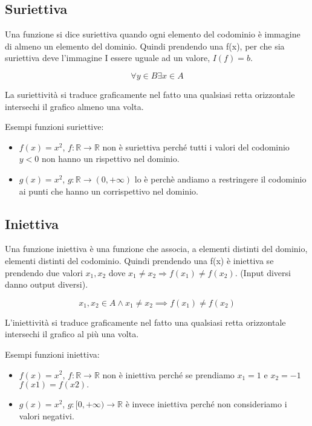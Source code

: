 \subsection{Suriettiva}
\begin{definition}[Suriettiva]
Una funzione si dice suriettiva quando ogni elemento del codominio è immagine di almeno un elemento del dominio. Quindi prendendo una f(x), per che sia suriettiva deve l'immagine I essere uguale ad un valore, $I(f) = b$.
\end{definition}
\begin{equation}
	\forall y \in B \exists x \in A
\end{equation}
\begin{note}
	La suriettività si traduce graficamente nel fatto una qualsiasi retta orizzontale intersechi il grafico almeno una volta.
\end{note}
\begin{example}
    Esempi funzioni suriettive:
    \begin{itemize}
        \item $f(x) = x^2$, $f: \mathbb{R} \longrightarrow \mathbb{R}$ non è suriettiva perché tutti i valori del codominio $y < 0$ non hanno un rispettivo nel dominio.
        \item $g(x) = x^2$, $g: \mathbb{R} \longrightarrow (0, +\infty)$ lo è perchè andiamo a restringere il codominio ai punti che hanno un corrispettivo nel dominio.
    \end{itemize}
\end{example}

\subsection{Iniettiva}
\begin{definition}[Iniettiva]
Una funzione iniettiva è una funzione che associa, a elementi distinti del dominio, elementi distinti del codominio. Quindi prendendo una f(x) è iniettiva se prendendo due valori $x_1, x_2$ dove $x_1 \neq x_2 \Longrightarrow f(x_1) \neq f(x_2)$. (Input diversi danno output diversi).
\end{definition}
\begin{equation}
	x_{1}, x_{2} \in A \wedge x_{1} \neq x_{2} \implies f(x_{1}) \neq f(x_{2})
\end{equation}
\begin{note}
	L'iniettività si traduce graficamente nel fatto una qualsiasi retta orizzontale intersechi il grafico al più una volta.
\end{note}
\begin{example}
    Esempi funzioni iniettiva:
    \begin{itemize}
        \item $f(x) = x^2$, $f: \mathbb{R} \longrightarrow \mathbb{R}$ non è iniettiva perché se prendiamo $x_1 = 1$ e $x_2 = -1$ $f(x1) = f(x2).$
        \item $g(x) = x^2$, $g: [0, +\infty) \longrightarrow \mathbb{R}$ è invece iniettiva perché non consideriamo i valori negativi.
    \end{itemize}
\end{example}

